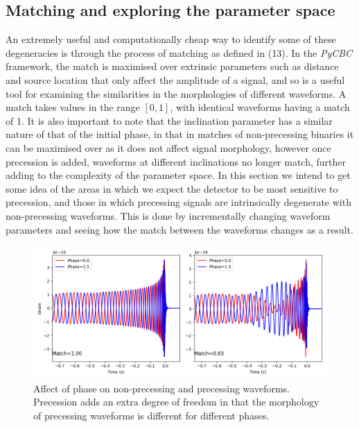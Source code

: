 \documentclass[11pt]{article}
\begin{document}
\subsection{Matching and exploring the parameter space}
An extremely useful and computationally cheap way to identify some of these degeneracies is through the process of matching as defined in (13). In the \textit{PyCBC} framework, the match is maximised over extrinsic parameters such as distance and source location that only affect the amplitude of a signal, and so is a useful tool for examining the similarities in the morphologies of different waveforms. A match takes values in the range $[0,1]$, with identical waveforms having a match of 1. It is also important to note that the inclination parameter has a similar nature of that of the initial phase, in that in matches of non-precessing binaries it can be maximised over as it does not affect signal morphology, however once precession is added, waveforms at different inclinations no longer match, further adding to the complexity of the parameter space. In this section we intend to get some idea of the areas in which we expect the detector to be most sensitive to precession, and those in which precessing signals are intrinsically degenerate with non-precessing waveforms. This is done by incrementally changing waveform parameters and seeing how the match between the waveforms changes as a result. 
\begin{figure}[h]
	\includegraphics[scale=0.58]{fig9.png}
	\centering
	\caption{Affect of phase on non-precessing and precessing waveforms. Precession adds an extra degree of freedom in that the morphology of precessing waveforms is different for different phases.}
	\centering
\end{figure}
\end{document}
